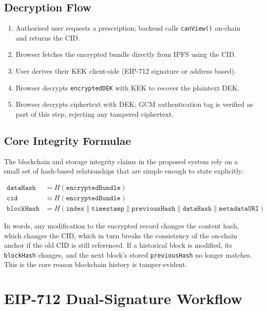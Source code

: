 \documentclass[12pt,a4wide]{report}
\begin{document}
\subsection{Decryption Flow}

\begin{enumerate}
  \item Authorised user requests a prescription; backend calls \texttt{canView()} on-chain and returns the CID.
  \item Browser fetches the encrypted bundle directly from IPFS using the CID.
  \item User derives their KEK client-side (EIP-712 signature or address based).
  \item Browser decrypts \texttt{encryptedDEK} with KEK to recover the plaintext DEK.
  \item Browser decrypts ciphertext with DEK; GCM authentication tag is verified as part of this step, rejecting any tampered ciphertext.
\end{enumerate}

\subsection{Core Integrity Formulae}

The blockchain and storage integrity claims in the proposed system rely on a small set of
hash-based relationships that are simple enough to state explicitly:

\begin{align*}
\mathtt{dataHash} &= H(\mathtt{encryptedBundle}) \\
\mathtt{cid} &\approx H(\mathtt{encryptedBundle}) \\
\mathtt{blockHash} &= H(\mathtt{index} \| \mathtt{timestamp} \| \mathtt{previousHash} \| \mathtt{dataHash} \| \mathtt{metadataURI})
\end{align*}

In words, any modification to the encrypted record changes the content hash,
which changes the CID, which in turn breaks the consistency of the on-chain
anchor if the old CID is still referenced. If a historical block is modified,
its \texttt{blockHash} changes, and the next block's stored \texttt{previousHash}
no longer matches. This is the core reason blockchain history is tamper-evident.

\section{EIP-712 Dual-Signature Workflow}
\end{document}

